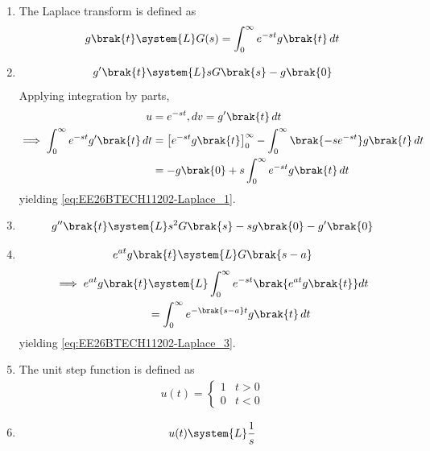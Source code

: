 \begin{enumerate}[label=\thesubsection.\arabic*, ref=\thesubsection.\theenumi]
\item The Laplace transform is defined as
\begin{align}
g\brak{t} \system{L} G(s) = \int_{0}^{\infty} e^{-st} g\brak{t} \, dt
\end{align}
\item \begin{align}
g^{\prime}\brak{t} \system{L}s G\brak{s}-g\brak{0} 
\label{eq:EE26BTECH11202-Laplace_1}
\end{align}
\solution 
Applying integration by parts, 
\begin{align}
	u &= e^{-st}, dv = g^{\prime}\brak{t} \, dt 
\\
\implies \int_{0}^{\infty} e^{-st} g^{\prime}\brak{t} \, dt
	  &=
 \left[ e^{-st} g\brak{t} \right]_{0}^{\infty} - \int_{0}^{\infty} \brak{-s e^{-st}} g\brak{t} \, dt \\
	  &=   - g\brak{0}  + s \int_{0}^{\infty} e^{-st} g\brak{t} \, dt 
\end{align}
yielding \eqref{eq:EE26BTECH11202-Laplace_1}.
\item 
\begin{align}
g^{\prime \prime}\brak{t} \system{L} s^2 G\brak{s} -sg\brak{0}-g^{\prime}\brak{0} \label{eq:EE26BTECH11202-Laplace_2}
\end{align}
\item 
\begin{align}
	e^{at} g\brak{t} \system{L} G\brak{s-a} 
	\label{eq:EE26BTECH11202-Laplace_3}
\end{align}
\solution
\begin{align}
	\implies e^{at} g\brak{t} &\system{L} \int_{0}^{\infty} e^{-st} \brak{e^{at} g\brak{t}} dt
	\\
				  &= \int_{0}^{\infty} e^{-\brak{s - a}t} g\brak{t} \, dt
\end{align}
yielding
\eqref{eq:EE26BTECH11202-Laplace_3}.
\item The unit step function is defined as
\begin{align}
	u(t) = 
	\begin{cases}
		1 & t > 0
		\\
		0 & t < 0
	\end{cases}
	\label{eq:EE26BTECH11202-step-func}
\end{align}
\item 
\begin{align}
	u(t) \system{L} \frac{1}{s} 
	\label{eq:EE26BTECH11202-Laplace_4.1}
\end{align}
\solution
\begin{align}

\end{align}
\end{enumerate}
